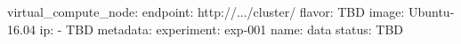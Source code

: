 virtual_compute_node:
  endpoint: http://.../cluster/
  flavor: TBD
  image: Ubuntu-16.04
  ip:
  - TBD
  metadata:
    experiment: exp-001
  name: data
  status: TBD
